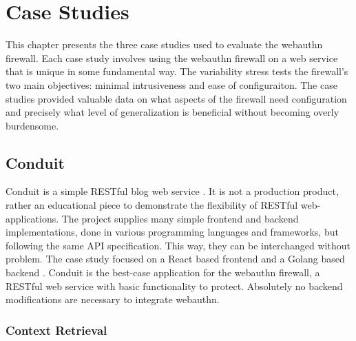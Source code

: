 
\chapter{Case Studies}\label{Chap:CaseStudies}

This chapter presents the three case studies used to evaluate the webauthn firewall. Each case study involves using the webauthn firewall on a web service that is unique in some fundamental way. The variability stress tests the firewall's two main objectives: minimal intrusiveness and ease of configuraiton. The case studies provided valuable data on what aspects of the firewall need configuration and precisely what level of generalization is beneficial without becoming overly burdensome.

\section{Conduit}

Conduit is a simple RESTful blog web service \cite{TODO-conduit}. It is not a production product, rather an educational piece to demonstrate the flexibility of RESTful web-applications. The project supplies many simple frontend and backend implementations, done in various programming languages and frameworks, but following the same API specification. This way, they can be interchanged without problem. The case study focused on a React based frontend \cite{TODO-Conduit-React-Frontend} and a Golang based backend \cite{TODO-Conduit-Go-Backend}. Conduit is the best-case application for the webauthn firewall, a RESTful web service with basic functionality to protect. Absolutely no backend modifications are necessary to integrate webauthn.


\subsection{Context Retrieval}\label{Sec:Conduit_ContextRetrieval}

